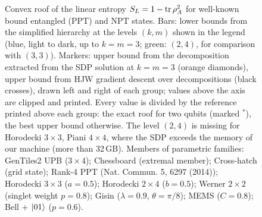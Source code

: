 \begin{figure}
  \caption{Convex roof of the linear entropy $S_L=1-\tr\rho_A^2$ for well-known bound entangled (PPT) and NPT
  states. Bars: lower bounds from the simplified hierarchy at the levels $(k,m)$ shown in the legend (blue, light to dark, up to $k=m=3$; green: $(2,4)$, for comparison with $(3,3)$). Markers: upper bound from the decomposition extracted from the SDP solution at $k=m=3$ (orange diamonds), upper bound from HJW gradient descent over decompositions (black crosses), drawn left and right of each group; values above the axis are clipped and printed. Every value is divided by the reference printed above each group: the exact roof for two qubits (marked $^*$), the best upper bound otherwise. The level $(2,4)$ is missing for Horodecki $3\times3$, Piani $4\times4$, where the SDP exceeds the memory of our machine (more than 32\,GB). Members of parametric families: GenTiles2 UPB ($3\times4$); Chessboard (extremal member); Cross-hatch (grid state); Rank-4 PPT (Nat. Commun. 5, 6297 (2014)); Horodecki $3\times3$ ($a=0.5$); Horodecki $2\times4$ ($b=0.5$); Werner $2\times2$ (singlet weight $p=0.8$); Gisin ($\lambda=0.9$, $\theta=\pi/8$); MEMS ($C=0.8$); Bell + $\ket{01}$ ($p=0.6$).}
  \label{fig:namedLinearEntropy}
\end{figure}
